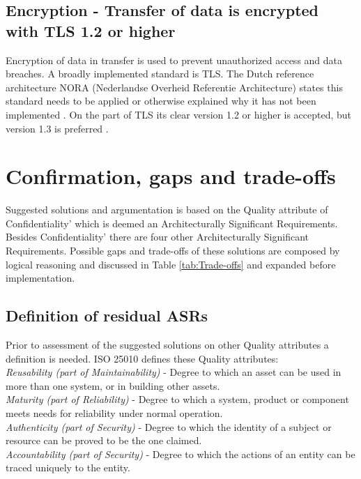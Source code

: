\subsection{Encryption - Transfer of data is encrypted with TLS 1.2 or higher} \label{encryption}
Encryption of data in transfer is used to prevent unauthorized access and data breaches. A broadly implemented standard is TLS. The Dutch reference architecture NORA (Nederlandse Overheid Referentie Architecture) \cite{NORA} states this standard needs to be applied or otherwise explained why it has not been implemented \cite{NORA_PasToeOfLegUit}. On the part of TLS its clear version 1.2 or higher is accepted, but version 1.3 is preferred \cite{NORA_TLS}. 

\section{Confirmation, gaps and trade-offs}
Suggested solutions and argumentation is based on the Quality attribute of Confidentiality' which is deemed an Architecturally Significant Requirements. Besides Confidentiality' there are four other Architecturally Significant Requirements. Possible gaps and trade-offs of these solutions are composed by logical reasoning and discussed in Table \ref{tab:Trade-offs} and expanded before implementation.

\subsection{Definition of residual ASRs}
Prior to assessment of the suggested solutions on other Quality attributes a definition is needed. ISO 25010 \cite{ISO:25010:2011} defines these Quality attributes: \\
\textit{Reusability (part of Maintainability)} - Degree to which an asset can be used in more than one system, or in building other assets. \\
\textit{Maturity (part of Reliability)} - Degree to which a system, product or component meets needs for reliability under normal operation. \\
\textit{Authenticity (part of Security)} - Degree to which the identity of a subject or resource can be proved to be the one claimed. \\
\textit{Accountability (part of Security)} - Degree to which the actions of an entity can be traced uniquely to the entity. \\

